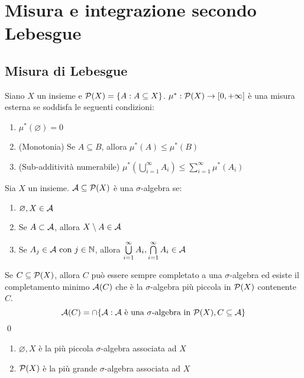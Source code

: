 \chapter{Misura e integrazione secondo Lebesgue}

\section{Misura di Lebesgue}

\begin{definition}
	Siano $X$ un insieme e $\mathcal{P}(X)=\{A:A\subseteq X\}$. $\mu^*:\mathcal{P}(X)\to [0,+\infty]$ è una misura esterna se soddisfa le seguenti condizioni:
	\begin{enumerate}
		\item $\mu^*(\varnothing)=0$
		\item (Monotonia) Se $A\subseteq B$, allora $\mu^*(A) \leq \mu^*(B)$
		\item (Sub-additività numerabile) $\mu^*\left(\bigcup\limits_{i=1}^\infty A_i\right)\leq \sum\limits_{i=1}^\infty \mu^*(A_i)$
	\end{enumerate}
\end{definition}

\begin{definition}
	Sia $X$ un insieme. $\mathcal{A} \subseteq \mathcal{P}(X)$ è una $\sigma$-algebra se:
	\begin{enumerate}
		\item $\varnothing, X \in \mathcal{A}$
		\item Se $A\subset \mathcal{A}$, allora $X \setminus A \in \mathcal{A}$
		\item Se $A_j \in \mathcal{A} \text{ con } j \in \mathbb{N}$, allora $\bigcup\limits_{i=1}^\infty A_i, \bigcap\limits_{i=1}^\infty A_i \in \mathcal{A}$
	\end{enumerate}
\end{definition}

\begin{prop}
	Se $C \subseteq \mathcal{P}(X)$, allora $C$ può essere sempre completato a una $\sigma$-algebra ed esiste il completamento minimo $\mathcal{A}(C)$ che è la $\sigma$-algebra più piccola in $\mathcal{P}(X)$ contenente $C$.
	$$
		\mathcal{A}(C)=\cap\{\mathcal{A}:\mathcal{A} \text{ è una } \sigma \text{-algebra in } \mathcal{P}(X), C \subseteq \mathcal{A}\}
	$$
	\qed
\end{prop}

\begin{remark}\leavevmode
	\begin{enumerate}
		\item ${\varnothing,X}$ è la più piccola $\sigma$-algebra associata ad $X$
		\item $\mathcal{P}(X)$ è la più grande $\sigma$-algebra associata ad $X$
	\end{enumerate}
\end{remark}

